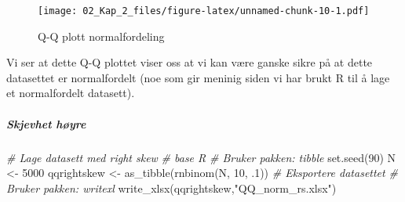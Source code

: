 \documentclass[
]{article}
\newenvironment{Shaded}{\begin{snugshade}}{\end{snugshade}}
\newcommand{\AttributeTok}[1]{\textcolor[rgb]{0.77,0.63,0.00}{#1}}
\newcommand{\CommentTok}[1]{\textcolor[rgb]{0.56,0.35,0.01}{\textit{#1}}}
\newcommand{\DecValTok}[1]{\textcolor[rgb]{0.00,0.00,0.81}{#1}}
\newcommand{\FunctionTok}[1]{\textcolor[rgb]{0.00,0.00,0.00}{#1}}
\newcommand{\NormalTok}[1]{#1}
\newcommand{\OtherTok}[1]{\textcolor[rgb]{0.56,0.35,0.01}{#1}}
\newcommand{\SpecialCharTok}[1]{\textcolor[rgb]{0.00,0.00,0.00}{#1}}
\newcommand{\StringTok}[1]{\textcolor[rgb]{0.31,0.60,0.02}{#1}}
\begin{document}
\begin{figure}
\centering
\texttt{[image: 02\_Kap\_2\_files/figure-latex/unnamed-chunk-10-1.pdf]}
\caption{\label{fig:unnamed-chunk-10}Q-Q plott normalfordeling}
\end{figure}

Vi ser at dette Q-Q plottet viser oss at vi kan være ganske sikre på at dette datasettet er normalfordelt (noe som gir meninig siden vi har brukt R til å lage et normalfordelt datasett).

\hypertarget{skjevhet-huxf8yre}{%
\subparagraph{Skjevhet høyre}\label{skjevhet-huxf8yre}}

\begin{Shaded}
\begin{Highlighting}[]
\CommentTok{\# Lage datasett med right skew}
\CommentTok{\# base R}
\CommentTok{\# Bruker pakken: tibble}
\FunctionTok{set.seed}\NormalTok{(}\DecValTok{90}\NormalTok{)}
\NormalTok{N }\OtherTok{\textless{}{-}} \DecValTok{5000}
\NormalTok{qqrightskew }\OtherTok{\textless{}{-}} \FunctionTok{as\_tibble}\NormalTok{(}\FunctionTok{rnbinom}\NormalTok{(N, }\DecValTok{10}\NormalTok{, .}\DecValTok{1}\NormalTok{))}
\CommentTok{\# Eksportere datasettet}
\CommentTok{\# Bruker pakken: writexl}
\FunctionTok{write\_xlsx}\NormalTok{(qqrightskew,}\StringTok{"QQ\_norm\_rs.xlsx"}\NormalTok{)}
\end{Highlighting}
\end{Shaded}

\begin{Shaded}
\end{Shaded}
\end{document}
